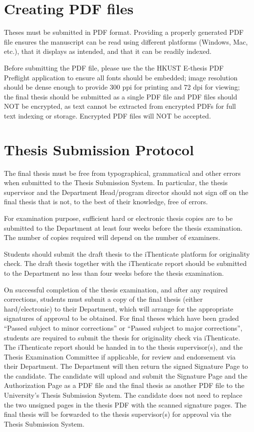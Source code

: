 \section{Creating PDF files}
Theses must be submitted in PDF format. Providing a properly generated PDF file ensures the manuscript can be read using different platforms (Windows, Mac, etc.), that it displays as intended, and that it can be readily indexed.

Before submitting the PDF file, please use the the HKUST E-thesis PDF Preflight application to ensure all fonts should be embedded; image resolution should be dense enough to provide 300 ppi for printing and 72 dpi for viewing; the final thesis should be submitted as a single PDF file and PDF files should NOT be encrypted, as text cannot be extracted from encrypted PDFs for full text indexing or storage. Encrypted PDF files will NOT be accepted.

\section{Thesis Submission Protocol}
The final thesis must be free from typographical, grammatical and other errors when submitted to the Thesis Submission System. In particular, the thesis supervisor and the Department Head/program director should not sign off on the final thesis that is not, to the best of their knowledge, free of errors.

For examination purpose, sufficient hard or electronic thesis copies are to be submitted to the Department at least four weeks before the thesis examination. The number of copies required will depend on the number of examiners.

Students should submit the draft thesis to the iThenticate platform for originality check. The draft thesis together with the iThenticate report should be submitted to the Department no less than four weeks before the thesis examination.

On successful completion of the thesis examination, and after any required corrections, students must submit a copy of the final thesis (either hard/electronic) to their Department, which will arrange for the appropriate signatures of approval to be obtained.
For final theses which have been graded “Passed subject to minor corrections” or “Passed subject to major corrections”, students are required to submit the thesis for originality check via iThenticate. The iThenticate report should be handed in to the thesis supervisor(s), and the Thesis Examination Committee if applicable, for review and endorsement via their Department.
The Department will then return the signed Signature Page to the candidate.
The candidate will upload and submit the Signature Page and the Authorization Page as a PDF file and the final thesis as another PDF file to the University’s Thesis Submission System. The candidate does not need to replace the two unsigned pages in the thesis PDF with the scanned signature pages. The final thesis will be forwarded to the thesis supervisor(s) for approval via the Thesis Submission System.

